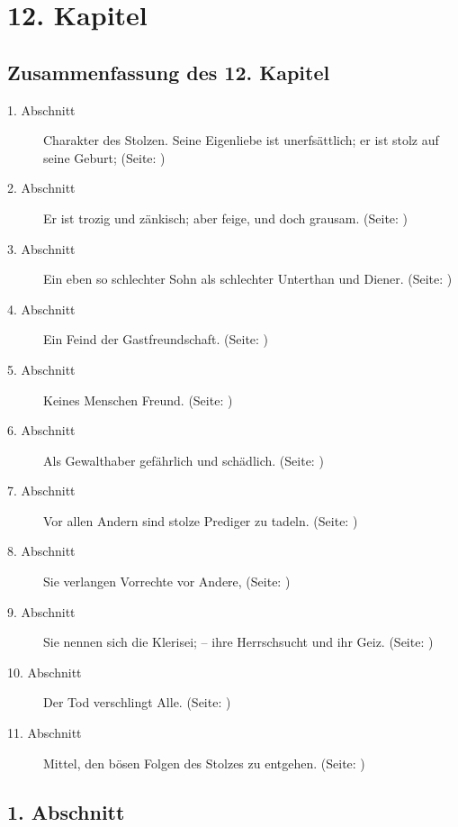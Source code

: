 

\chapter{12. Kapitel} \label{kap12}

\section{Zusammenfassung des 12. Kapitel}
\small
\begin{description}
\item[1. Abschnitt] Charakter des Stolzen. Seine Eigenliebe ist unerfsättlich;
er
ist stolz auf seine Geburt; (Seite: \pageref{kap12_ab1})
\item[2. Abschnitt] Er ist trozig und zänkisch; aber feige, und doch grausam.
(Seite: \pageref{kap12_ab2})
\item[3. Abschnitt] Ein eben so schlechter Sohn als schlechter Unterthan und
Diener. (Seite: \pageref{kap12_ab3})
\item[4. Abschnitt] Ein Feind der Gastfreundschaft. (Seite: \pageref{kap12_ab4})
\item[5. Abschnitt] Keines Menschen Freund. (Seite: \pageref{kap12_ab5})
\item[6. Abschnitt] Als Gewalthaber gefährlich und schädlich. (Seite:
\pageref{kap12_ab6})
\item[7. Abschnitt] Vor allen Andern sind stolze Prediger zu tadeln. (Seite:
\pageref{kap12_ab7})
\item[8. Abschnitt] Sie verlangen Vorrechte vor Andere, (Seite:
\pageref{kap12_ab8})
\item[9. Abschnitt] Sie nennen sich die Klerisei; -- ihre Herrschsucht und ihr
Geiz. (Seite: \pageref{kap12_ab9})
\item[10. Abschnitt] Der Tod verschlingt Alle. (Seite: \pageref{kap12_ab10})
\item[11. Abschnitt] Mittel, den bösen Folgen des Stolzes zu entgehen. (Seite:
\pageref{kap12_ab11})
\end{description}
\normalsize

\section{1. Abschnitt} \label{kap12_ab1}

